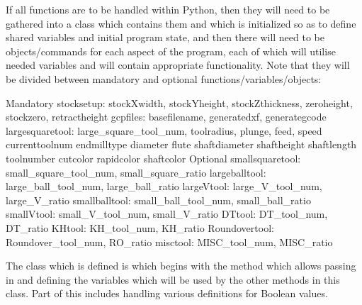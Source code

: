 \documentclass{ltxdoc}
\begin{document}
If all functions are to be handled within Python, then they will need to be gathered into a class which contains them and which is initialized so as to define shared variables and initial program state, and then there will need to be objects/commands for each aspect of the program, each of which will utilise needed variables and will contain appropriate functionality. Note that they will be divided between mandatory and optional functions/variables/objects:

\begin{outline}
\1 Mandatory
   \2 stocksetup:
      \3 stockXwidth, stockYheight, stockZthickness, zeroheight, stockzero, retract\-height
   \2 gcpfiles: 
      \3 basefilename, generatedxf, generategcode
   \2 largesquaretool: 
      \3 large\_square\_tool\_num, toolradius, plunge, feed, speed
   \2 currenttoolnum
      \3 endmilltype
      \3 diameter
      \3 flute
      \3 shaftdiameter
      \3 shaftheight
      \3 shaftlength
      \3 toolnumber
      \3 cutcolor
      \3 rapidcolor
      \3 shaftcolor
\1 Optional
   \2 smallsquaretool: 
      \3small\_square\_tool\_num, small\_square\_ratio
   \2 largeballtool: 
      \3 large\_ball\_tool\_num, large\_ball\_ratio
   \2 largeVtool: 
      \3 large\_V\_tool\_num, large\_V\_ratio
   \2 smallballtool: 
      \3 small\_ball\_tool\_num, small\_ball\_ratio
   \2 smallVtool: 
      \3 small\_V\_tool\_num, small\_V\_ratio
   \2 DTtool: 
      \3 DT\_tool\_num, DT\_ratio
   \2 KHtool: 
      \3 KH\_tool\_num, KH\_ratio
   \2 Roundovertool: 
      \3 Roundover\_tool\_num, RO\_ratio
   \2 misctool: 
      \3 MISC\_tool\_num, MISC\_ratio
\end{outline}

The class which is defined is  which begins with the  method which allows passing in and defining the variables which will be used by the other methods in this class. Part of this includes handling various definitions for Boolean values.
\end{document}
